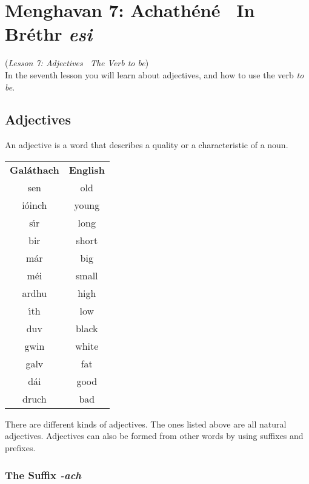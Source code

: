 \section{Menghavan 7: Achath\'{e}n\'{e} \textemdash\ In Br\'{e}thr \textit{esi}}
(\textit{Lesson 7: Adjectives \textemdash\ The Verb \textit{to be}})\\

In the seventh lesson you will learn about adjectives, and how to use the verb \textit{to be}.

\subsection{Adjectives}

An adjective is a word that describes a quality or a characteristic of a noun.
\begin{table}[H]
\centering
\begin{tabular}{cc}
  \toprule
  \textbf{Gal\'{a}thach} & \textbf{English}\\
  \cmidrule(lr){1-1}\cmidrule(lr){2-2}
  sen & old\\
  i\'{o}inch & young\\
  s\'{\i}r & long\\
  bir & short\\
  m\'{a}r & big\\
  m\'{e}i & small\\
  ardhu & high\\
  \'{\i}th & low\\
  duv & black\\
  gwin & white\\
  galv & fat\\
  d\'{a}i & good\\
  druch & bad\\
  \bottomrule
\end{tabular}
\label{examples_adjective}
\end{table}

There are different kinds of adjectives. The ones listed above are all natural adjectives. Adjectives can also be formed from other words by using suffixes and prefixes.

\subsubsection{The Suffix \textit{-ach}}

